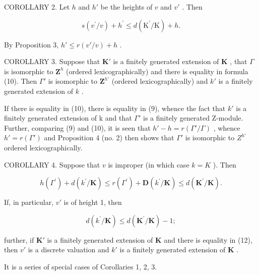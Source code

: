 COROLLARY 2. Let \(h\) and \(h'\) be the heights of \(v\) and \(v'\) . Then

\[
s (v ^ {\prime} / v) + h ^ {\prime} \leqslant d (\mathrm{K} ^ {\prime} / \mathrm{K}) + h.\tag{10}
\]

By Proposition 3, \(h' \leqslant r(v'/v) + h\) .

COROLLARY 3. Suppose that \(\mathbf{K}'\) is a finitely generated extension of \(\mathbf{K}\) , that \(\Gamma\) is isomorphic to \(\mathbf{Z}^h\) (ordered lexicographically) and there is equality in formula (10). Then \(\Gamma'\) is isomorphic to \(\mathbf{Z}^{h'}\) (ordered lexicographically) and \(k'\) is a finitely generated extension of \(k\) .

If there is equality in (10), there is equality in (9), whence the fact that \(k'\) is a finitely generated extension of k and that \(\Gamma'\) is a finitely generated Z-module. Further, comparing (9) and (10), it is seen that \(h' - h = r(\Gamma'/\Gamma)\) , whence \(h' = r(\Gamma')\) and Proposition 4 (no. 2) then shows that \(\Gamma'\) is isomorphic to \(Z^{h'}\) ordered lexicographically.

COROLLARY 4. Suppose that \(v\) is improper (in which case \(k = K\) ). Then

\[
h (\Gamma^ {\prime}) + d (k ^ {\prime} / \mathbf {K}) \leqslant r (\Gamma^ {\prime}) + \mathbf {D} (k ^ {\prime} / \mathbf {K}) \leqslant d (\mathbf {K} ^ {\prime} / \mathbf {K}).\tag{11}
\]

If, in particular, \(v'\) is of height 1, then

\[
d (k ^ {\prime} / \mathbf {K}) \leqslant d (\mathbf {K} ^ {\prime} / \mathbf {K}) - 1;\tag{12}
\]

further, if \(\mathbf{K}'\) is a finitely generated extension of \(\mathbf{K}\) and there is equality in (12), then \(v'\) is a discrete valuation and \(k'\) is a finitely generated extension of \(\mathbf{K}\) .

It is a series of special cases of Corollaries 1, 2, 3.



